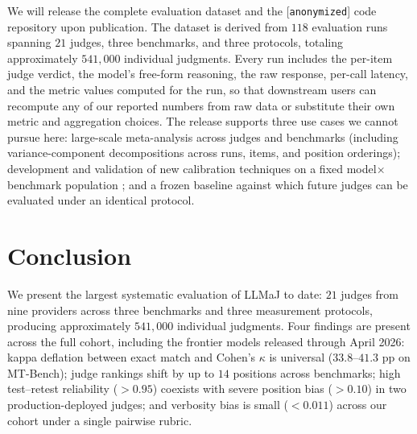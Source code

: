 \documentclass[11pt]{article}
\begin{document}
We will release the complete evaluation dataset and the [\texttt{anonymized}] code repository upon publication. The dataset is derived from $118$ evaluation runs spanning $21$ judges, three benchmarks, and three protocols, totaling approximately $541{,}000$ individual judgments. Every run includes the per-item judge verdict, the model's free-form reasoning, the raw response, per-call latency, and the metric values computed for the run, so that downstream users can recompute any of our reported numbers from raw data or substitute their own metric and aggregation choices. The release supports three use cases we cannot pursue here: large-scale meta-analysis across judges and benchmarks (including variance-component decompositions across runs, items, and position orderings); development and validation of new calibration techniques on a fixed model$\times$benchmark population \citep{li-etal-2025-voices}; and a frozen baseline against which future judges can be evaluated under an identical protocol.

\section{Conclusion}


We present the largest systematic evaluation of LLMaJ to date: $21$ judges from nine providers across three benchmarks and three measurement protocols, producing approximately $541{,}000$ individual judgments. Four findings are present across the full cohort, including the frontier models released through April 2026: kappa deflation between exact match and Cohen's $\kappa$ is universal ($33.8$--$41.3$ pp on MT-Bench); judge rankings shift by up to $14$ positions across benchmarks; high test--retest reliability ($>0.95$) coexists with severe position bias ($>0.10$) in two production-deployed judges; and verbosity bias is small ($<0.011$) across our cohort under a single pairwise rubric.
\end{document}
